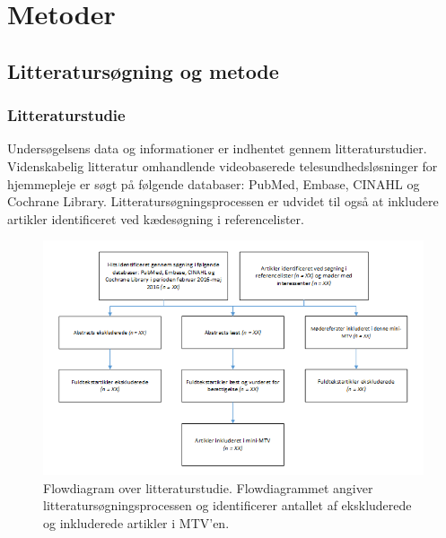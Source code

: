 \chapter{Metoder}
\section{Litteratursøgning og metode}
\subsection{Litteraturstudie}
Undersøgelsens data og informationer er indhentet gennem litteraturstudier. Videnskabelig litteratur omhandlende videobaserede telesundhedsløsninger for hjemmepleje er søgt på følgende databaser: PubMed, Embase, CINAHL og Cochrane Library. Litteratursøgningsprocessen er udvidet til også at inkludere artikler identificeret ved kædesøgning i referencelister.\\
\begin{figure}[H]
\centering
\includegraphics[width=1\textwidth]{Figurer/metode_flow.png}
\caption{\label{fig:metodeflow}Flowdiagram over  litteraturstudie. Flowdiagrammet angiver litteratursøgningsprocessen og identificerer antallet af ekskluderede og inkluderede artikler i MTV'en.}
\end{figure}


